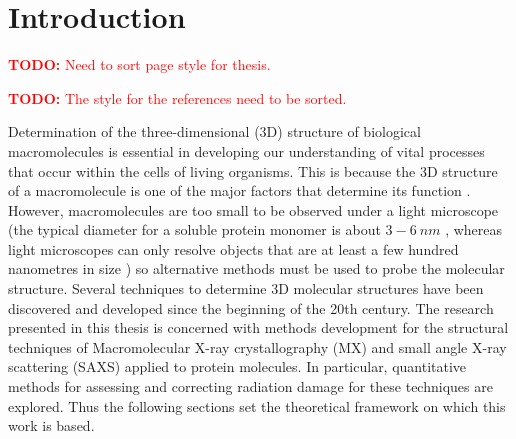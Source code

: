 \chapter{Introduction}
\label{chap:Introduction}
\textcolor{red}{
\begin{myenumerate}
    \item \hypertarget{todo:SortPageStyle}{\textbf{TODO:} Need to sort page style for thesis.}
    \item \hypertarget{todo:SortReferenceStyle}{\textbf{TODO:} The style for the references need to be sorted.}
\end{myenumerate}
}
Determination of the three-dimensional (3D) structure of biological macromolecules is essential in developing our understanding of vital processes that occur within the cells of living organisms.
This is because the 3D structure of a macromolecule is one of the major factors that determine its function \cite[s~3.6]{berg2002,hegyi1999}.
However, macromolecules are too small to be observed under a light microscope (the typical diameter for a soluble protein monomer is about $3-6\ nm$ \cite{Philips2015}, whereas light microscopes can only resolve objects that are at least a few hundred nanometres in size \cite[p~54]{starr2010}) so alternative methods must be used to probe the molecular structure.
Several techniques to determine 3D molecular structures have been discovered and developed since the beginning of the 20th century.
The research presented in this thesis is concerned with methods development for the structural techniques of Macromolecular X-ray crystallography (MX) and small angle X-ray scattering (SAXS) applied to protein molecules.
In particular, quantitative methods for assessing and correcting radiation damage for these techniques are explored.
Thus the following sections set the theoretical framework on which this work is based.
